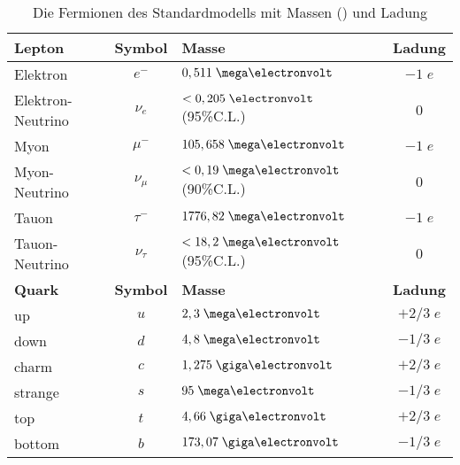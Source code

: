 \begin{table}
    \centering
    \begin{tabular}{|l|c|l|c|}
        \hline
        \bf{Lepton} & \bf{Symbol} & \bf{Masse} & \bf{Ladung} \\
        \hline\hline
        Elektron          & $e^-$      & $0,511 \MeV$             & $-1\;e$ \\
        Elektron-Neutrino & $\nu_e$    & $<0,205 \eV$ (95\%C.L.)  & $0$     \\
        \hline
        Myon              & $\mu^-$    & $105,658 \MeV$           & $-1\;e$ \\
        Myon-Neutrino     & $\nu_\mu$  & $<0,19 \MeV$  (90\%C.L.) & $0$     \\
        \hline
        Tauon             & $\tau^-$   & $1776,82 \MeV$           & $-1\;e$ \\
        Tauon-Neutrino    & $\nu_\tau$ & $<18,2 \MeV$  (95\%C.L.) & $0$     \\
        \hline\hline
        \bf{Quark} & \bf{Symbol} & \bf{Masse} & \bf{Ladung} \\
        \hline\hline
        up      & $u$ & $2,3 \MeV$    & $+2/3\;e$ \\
        down    & $d$ & $4,8 \MeV$    & $-1/3\;e$ \\
        \hline
        charm   & $c$ & $1,275 \GeV$  & $+2/3\;e$ \\
        strange & $s$ & $95  \MeV$    & $-1/3\;e$ \\
        \hline
        top     & $t$ & $4,66 \GeV$   & $+2/3\;e$ \\
        bottom  & $b$ & $173,07 \GeV$ & $-1/3\;e$ \\
        \hline
    \end{tabular}
    \caption[Die Fermionen des Standardmodells]
        {Die Fermionen des Standardmodells mit Massen
        (\cite{PhysRevD.86.010001}) und Ladung}
    \label{tab:fermions}
\end{table}



